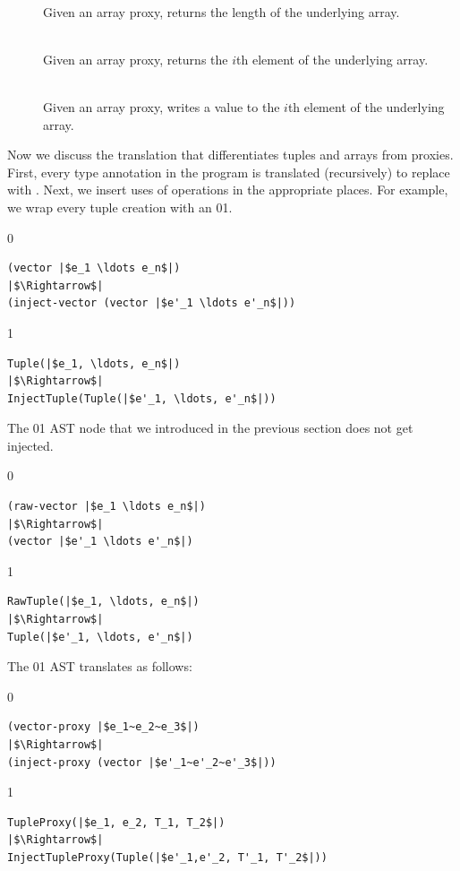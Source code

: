 \documentclass[7x10]{TimesAPriori_MIT}%
\def\racketEd{0}
\def\pythonEd{1}
\def\edition{1}
\newcommand{\racket}[1]{{\if\edition\racketEd{#1}\fi}}
\newcommand{\pythonColor}[0]{}
\newcommand{\python}[1]{{\if\edition\pythonEd\pythonColor #1\fi}}
\numberwithin{theorem}{chapter}
\numberwithin{definition}{chapter}
\numberwithin{equation}{chapter}
\begin{document}
{\begin{description}
\item[]\ \\
%
  Given an array proxy, returns the length of the underlying array.
  
\item[]\ \\
%
  Given an array proxy, returns the $i$th element of the underlying
  array.

\item[]\ \\
%  
    Given an array proxy, writes a value to the $i$th element of the
    underlying array.
\end{description}

\fi}

Now we discuss the translation that differentiates tuples and arrays
from proxies. First, every type annotation in the program is
translated (recursively) to replace \TUPLETYPENAME{} with \PTUPLETYNAME{}.
Next, we insert uses of \PTUPLETYNAME{} operations in the appropriate
places. For example, we wrap every tuple creation with an
\racket{}\python{}.
%
{\if\edition\racketEd
\begin{minipage}{0.96\textwidth}
\begin{lstlisting}
(vector |$e_1 \ldots e_n$|)
|$\Rightarrow$|
(inject-vector (vector |$e'_1 \ldots e'_n$|))
\end{lstlisting}
\end{minipage}
\fi}
{\if\edition\pythonEd\pythonColor    
\begin{lstlisting}
Tuple(|$e_1, \ldots, e_n$|)
|$\Rightarrow$|
InjectTuple(Tuple(|$e'_1, \ldots, e'_n$|))
\end{lstlisting}
\fi}

The \racket{}\python{}
AST node that we introduced in the previous
section does not get injected.
{\if\edition\racketEd    
\begin{lstlisting}
(raw-vector |$e_1 \ldots e_n$|)
|$\Rightarrow$|
(vector |$e'_1 \ldots e'_n$|)
\end{lstlisting}
\fi}
{\if\edition\pythonEd\pythonColor    
\begin{lstlisting}
RawTuple(|$e_1, \ldots, e_n$|)
|$\Rightarrow$|
Tuple(|$e'_1, \ldots, e'_n$|)
\end{lstlisting}
\fi}

The \racket{}\python{} AST
translates as follows:
%
{\if\edition\racketEd    
\begin{lstlisting}
(vector-proxy |$e_1~e_2~e_3$|)
|$\Rightarrow$|
(inject-proxy (vector |$e'_1~e'_2~e'_3$|))
\end{lstlisting}
\fi}
{\if\edition\pythonEd\pythonColor
\begin{lstlisting}
TupleProxy(|$e_1, e_2, T_1, T_2$|)
|$\Rightarrow$|
InjectTupleProxy(Tuple(|$e'_1,e'_2, T'_1, T'_2$|))
\end{lstlisting}
\fi}
\end{document}
